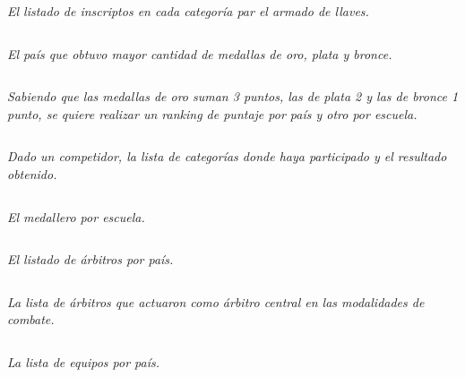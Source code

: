 

\emph{El listado de inscriptos en cada categoría par el armado de llaves.}
\begin{lstlisting}[language=SQL]
%% ACA LA QUERY
\end{lstlisting}

\emph{El país que obtuvo mayor cantidad de medallas de oro, plata y bronce.}
\begin{lstlisting}[language=SQL]
%% ACA LA QUERY
\end{lstlisting}


\emph{Sabiendo que las medallas de oro suman 3 puntos, las de plata 2 y las de bronce 1 punto, se quiere realizar un ranking de puntaje por país y otro por escuela.}
\begin{lstlisting}[language=SQL]
%% ACA LA QUERY
\end{lstlisting}


\emph{Dado un competidor, la lista de categorías donde haya participado y el resultado obtenido.}
\begin{lstlisting}[language=SQL]
%% ACA LA QUERY
\end{lstlisting}



\emph{El medallero por escuela.}
\begin{lstlisting}[language=SQL]
%% ACA LA QUERY
\end{lstlisting}


\emph{El listado de árbitros por país.}
\begin{lstlisting}[language=SQL]
%% ACA LA QUERY
\end{lstlisting}


\emph{La lista de árbitros que actuaron como árbitro central en las modalidades de combate.}
\begin{lstlisting}[language=SQL]
%% ACA LA QUERY
\end{lstlisting}


\emph{La lista de equipos por país.}
\begin{lstlisting}[language=SQL]
%% ACA LA QUERY
\end{lstlisting}
